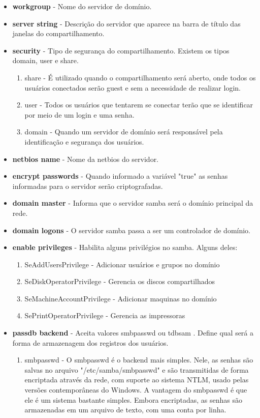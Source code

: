 \begin{itemize}
	\item \textbf{workgroup} - Nome do servidor de domínio.
	\item \textbf{server string} - Descrição do servidor que aparece na barra de título das janelas do compartilhamento.
	\item \textbf{security} - Tipo de segurança do compartilhamento. Existem os tipos domain, user e share.
		\begin{enumerate}
			\item {share}  - É utilizado quando o compartilhamento será aberto, onde todos os usuários conectados serão guest e sem a necessidade de realizar login.
			\item {user} - Todos os usuários que tentarem se conectar terão que se identificar por meio de um login e uma senha.
			\item {domain} - Quando um servidor de domínio será responsável pela identificação e segurança dos usuários.
		\end{enumerate} 
	\item \textbf{netbios name} - Nome da netbios do servidor.
	\item \textbf{encrypt passwords} - Quando informado a variável "true" as senhas informadas para o servidor serão criptografadas.
	\item \textbf{domain master} - Informa que o servidor samba será o domínio principal da rede.
	\item \textbf{domain logons} - O servidor samba passa a ser um controlador de domínio.
	\item \textbf{enable privileges} - Habilita alguns privilégios no samba. Alguns deles:
		\begin{enumerate}
			\item {SeAddUsersPrivilege} - Adicionar usuários e grupos no domínio 
			\item {SeDiskOperatorPrivilege} - Gerencia os discos compartilhados 
			\item {SeMachineAccountPrivilege} - Adicionar maquinas no domínio 
			\item {SePrintOperatorPrivilege} - Gerencia as impressoras
		\end{enumerate}
	\item \textbf{passdb backend} - Aceita valores smbpasswd ou tdbsam . Define qual será a forma de armazenagem dos registros dos usuários.
		\begin{enumerate}
			\item{smbpasswd} - O smbpasswd é o backend mais simples. Nele, as senhas são salvas no arquivo "/etc/samba/smbpasswd" e são transmitidas de forma encriptada através da rede, com suporte ao sistema NTLM, usado pelas versões contemporâneas do Windows. A vantagem do smbpasswd é que ele é um sistema bastante simples. Embora encriptadas, as senhas são armazenadas em um arquivo de texto, com uma conta por linha.\cite{BACKEND}

\end{enumerate}
\end{itemize}

